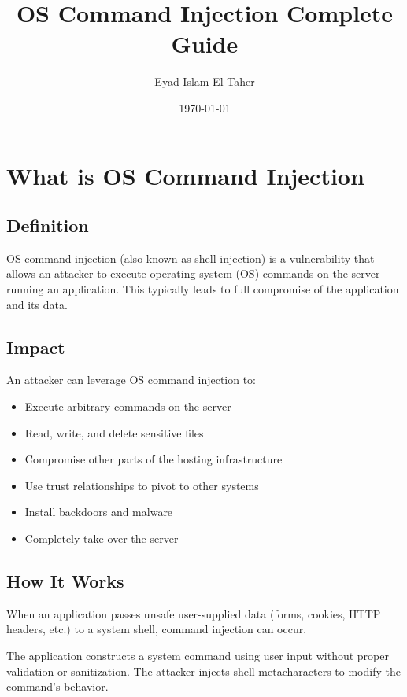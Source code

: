 \documentclass[12pt]{article}
\title{OS Command Injection Complete Guide}
\author{Eyad Islam El-Taher}
\date{\today}
\begin{document}
\maketitle
\tableofcontents
\newpage

\section{What is OS Command Injection}

\subsection{Definition}

OS command injection (also known as shell injection) is a vulnerability that allows an attacker to execute operating system (OS) commands on the server running an application. This typically leads to full compromise of the application and its data.

\subsection{Impact}

An attacker can leverage OS command injection to:

\begin{itemize}
    \item Execute arbitrary commands on the server
    \item Read, write, and delete sensitive files
    \item Compromise other parts of the hosting infrastructure
    \item Use trust relationships to pivot to other systems
    \item Install backdoors and malware
    \item Completely take over the server
\end{itemize}

\subsection{How It Works}

When an application passes unsafe user-supplied data (forms, cookies, HTTP headers, etc.) to a system shell, command injection can occur.

\begin{infobox}
The application constructs a system command using user input without proper validation or sanitization. The attacker injects shell metacharacters to modify the command's behavior.
\end{infobox}
\end{document}
